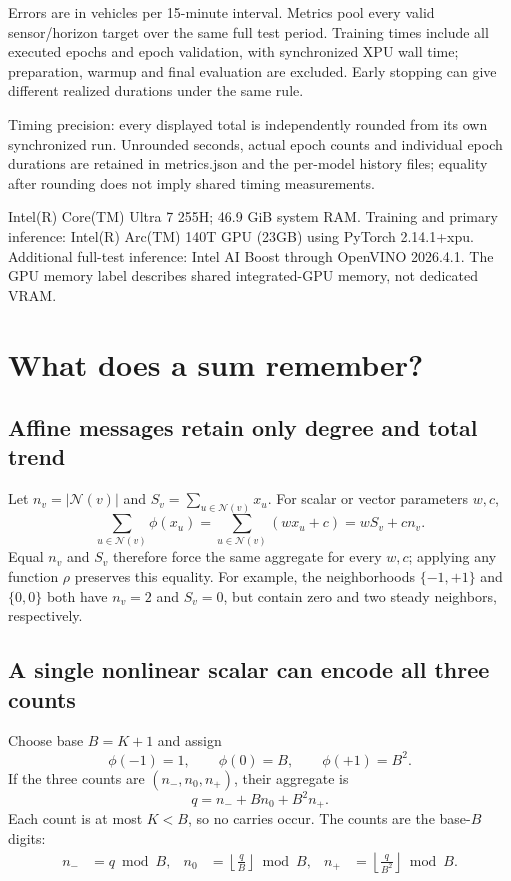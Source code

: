 \documentclass[11pt,a4paper]{article}
\begin{document}
{\small Errors are in vehicles per 15-minute interval. Metrics pool every valid sensor/horizon target over the same full test period. Training times include all executed epochs and epoch validation, with synchronized XPU wall time; preparation, warmup and final evaluation are excluded. Early stopping can give different realized durations under the same rule.}


{\small Timing precision: every displayed total is independently rounded from its own synchronized run. Unrounded seconds, actual epoch counts and individual epoch durations are retained in metrics.json and the per-model history files; equality after rounding does not imply shared timing measurements.}


Intel(R) Core(TM) Ultra 7 255H; 46.9 GiB system RAM. Training and primary inference: Intel(R) Arc(TM) 140T GPU (23GB) using PyTorch 2.14.1+xpu. Additional full-test inference: Intel AI Boost through OpenVINO 2026.4.1. The GPU memory label describes shared integrated-GPU memory, not dedicated VRAM.


\FloatBarrier\section{What does a sum remember?}\label{sec:q1}
\subsection{Affine messages retain only degree and total trend}

Let \(n_v=|\mathcal N(v)|\) and \(S_v=\sum_{u\in\mathcal N(v)}x_u\). For scalar or vector parameters \(w,c\),
\begin{equation}\label{eq:affine}
\sum_{u\in\mathcal N(v)}\phi(x_u)
=\sum_{u\in\mathcal N(v)}(wx_u+c)=wS_v+cn_v.
\end{equation}
Equal \(n_v\) and \(S_v\) therefore force the same aggregate for every \(w,c\); applying any function \(\rho\) preserves this equality. For example, the neighborhoods \(\{-1,+1\}\) and \(\{0,0\}\) both have \(n_v=2\) and \(S_v=0\), but contain zero and two steady neighbors, respectively.


\subsection{A single nonlinear scalar can encode all three counts}

Choose base \(B=K+1\) and assign
\begin{equation}
\phi(-1)=1,\qquad \phi(0)=B,\qquad \phi(+1)=B^2.
\end{equation}
If the three counts are \((n_-,n_0,n_+)\), their aggregate is
\begin{equation}q=n_-+Bn_0+B^2n_+.\end{equation}
Each count is at most \(K<B\), so no carries occur. The counts are the base-\(B\) digits:
\begin{align}
n_-&=q\bmod B, & n_0&=\left\lfloor\frac qB\right\rfloor\bmod B,
& n_+&=\left\lfloor\frac q{B^2}\right\rfloor\bmod B.
\end{align}
\end{document}
